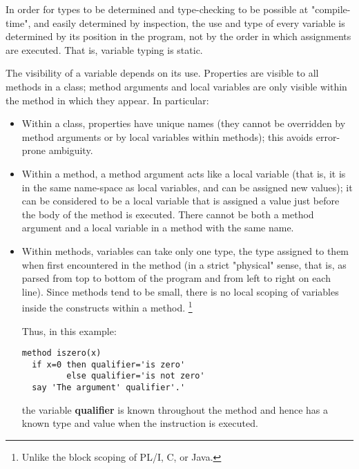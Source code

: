 In order for types to be determined and type-checking to be possible at
"compile-time", and easily determined by inspection, the use and
type of every variable is determined by its position in the program, not
by the order in which assignments are executed.
That is, variable typing is static.
 
The visibility of a variable depends on its use.  Properties are
visible to all methods in a class; method arguments and local variables
are only visible within the method in which they appear.  In particular:
\begin{itemize}
\item Within a class, properties have unique names (they cannot be
overridden by method arguments or by local variables within
methods); this avoids error-prone ambiguity.
\item 
Within a method, a method argument acts like a local variable (that is,
it is in the same name-space as local variables, and can be assigned new
values); it can be considered to be a local variable that is assigned a
value just before the body of the method is executed.  There cannot be
both a method argument and a local variable in a method with the same
name.
\item 
Within methods, variables can take only one type, the type assigned to
them when first encountered in the method (in a strict "physical"
sense, that is, as parsed from top to bottom of the program and from
left to right on each line).
Since methods tend to be small, there is no local scoping of variables
inside the constructs within a method.
\footnote{
Unlike the block scoping of PL/I, C, or Java.
}
 
Thus, in this example:
\begin{lstlisting}
method iszero(x)
  if x=0 then qualifier='is zero'
         else qualifier='is not zero'
  say 'The argument' qualifier'.'
\end{lstlisting}
the variable \textbf{qualifier} is known throughout the method and
hence has a known type and value when the  instruction is
executed.
\end{itemize}
 
